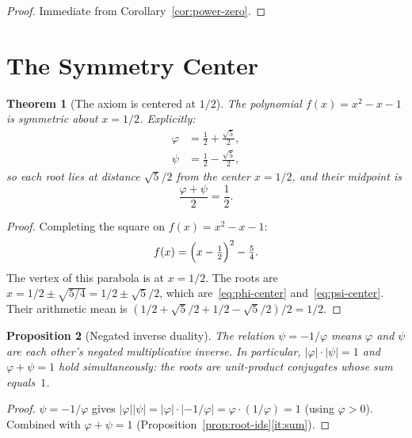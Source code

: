 \documentclass[12pt, a4paper]{article}
\theoremstyle{plain}
\newtheorem{theorem}{Theorem}[section]
\newtheorem{proposition}[theorem]{Proposition}
\theoremstyle{definition}
\theoremstyle{remark}
\newcommand{\vp}{\varphi}
\begin{document}
\begin{proof}
  Immediate from Corollary~\ref{cor:power-zero}.
\end{proof}

\section{The Symmetry Center}\label{sec:center}

\begin{theorem}[The axiom is centered at $1/2$]\label{thm:center}
  The polynomial $f(x) = x^2 - x - 1$ is symmetric about $x = 1/2$.
  Explicitly:
  \begin{align}
    \vp &= \tfrac{1}{2} + \tfrac{\sqrt{5}}{2},
      \label{eq:phi-center} \\
    \psi &= \tfrac{1}{2} - \tfrac{\sqrt{5}}{2},
      \label{eq:psi-center}
  \end{align}
  so each root lies at distance $\sqrt{5}/2$ from the center
  $x = 1/2$, and their midpoint is
  \begin{equation}\label{eq:midpoint}
    \frac{\vp + \psi}{2} = \frac{1}{2}.
  \end{equation}
\end{theorem}

\begin{proof}
  Completing the square on $f(x) = x^2 - x - 1$:
  \[
    f(x) = \Bigl(x - \tfrac{1}{2}\Bigr)^2 - \tfrac{5}{4}.
  \]
  The vertex of this parabola is at $x = 1/2$.
  The roots are $x = 1/2 \pm \sqrt{5/4} = 1/2 \pm \sqrt{5}/2$,
  which are~\eqref{eq:phi-center} and~\eqref{eq:psi-center}.
  Their arithmetic mean is $(1/2 + \sqrt{5}/2 + 1/2 - \sqrt{5}/2)/2
  = 1/2$.
\end{proof}

\begin{proposition}[Negated inverse duality]\label{prop:negated-inv}
  The relation $\psi = -1/\vp$ means $\vp$ and $\psi$ are each
  other's negated multiplicative inverse.  In particular,
  $|\vp| \cdot |\psi| = 1$ and $\vp + \psi = 1$ hold simultaneously:
  the roots are unit-product conjugates whose sum equals~$1$.
\end{proposition}

\begin{proof}
  $\psi = -1/\vp$ gives $|\vp||\psi| = |\vp| \cdot |{-1/\vp}|
  = \vp \cdot (1/\vp) = 1$ (using $\vp > 0$).
  Combined with $\vp + \psi = 1$
  (Proposition~\ref{prop:root-ids}\ref{it:sum}).
\end{proof}
\end{document}
